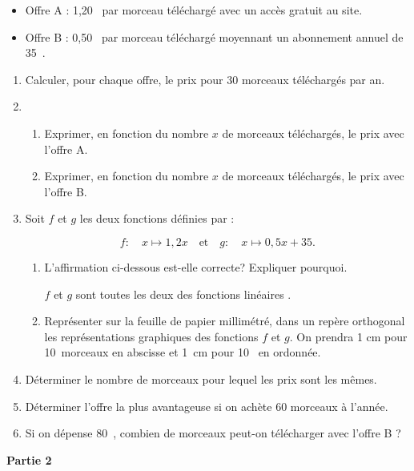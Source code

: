 \documentclass[10pt]{article}
\newcommand{\euro}{\eurologo{}}
\begin{document}
\medskip

\setlength\parindent{5mm}
\begin{itemize}
\item Offre A : 1,20~\euro{} par morceau téléchargé avec un accès gratuit au site.
\item Offre B : 0,50~\euro{} par morceau téléchargé moyennant un abonnement annuel de 35~\euro.
\end{itemize}
\setlength\parindent{0mm}

\medskip

\begin{enumerate}
\item  Calculer, pour chaque offre, le prix pour 30 morceaux téléchargés par an.
\item  
	\begin{enumerate}
		\item  Exprimer, en fonction du nombre $x$ de morceaux téléchargés, le prix avec l'offre A. 
		\item  Exprimer, en fonction du nombre $x$ de morceaux téléchargés, le prix avec l'offre B.
	\end{enumerate}
\item  Soit $f$ et $g$ les deux fonctions définies par : 

\[f : \quad x \longmapsto 1,2x\quad  \text{et} \quad  g : \quad  x \longmapsto 0,5x+35.\]

	\begin{enumerate}
		\item  L'affirmation ci-dessous est-elle correcte? Expliquer pourquoi.
		
\og $f$ et $g$ sont toutes les deux des fonctions linéaires \fg.
		\item  Représenter sur la feuille de papier millimétré, dans un repère orthogonal les représentations graphiques des fonctions $f$ et $g$. On prendra 1 cm pour 10~morceaux en abscisse et 1~cm pour 10~\euro{} en ordonnée.
 	\end{enumerate}
\item  Déterminer le nombre de morceaux pour lequel les prix sont les mêmes.
\item  Déterminer l'offre la plus avantageuse si on achète 60 morceaux à l'année.
\item  Si on dépense 80~\euro, combien de morceaux peut-on télécharger avec l'offre B ?
\end{enumerate}

\medskip

\textbf{Partie 2}
\end{document}
